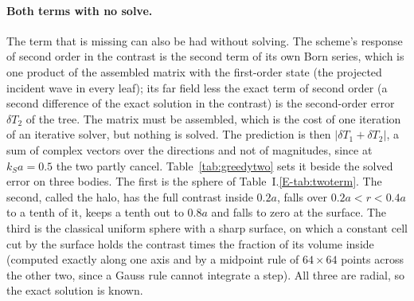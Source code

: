 \documentclass[11pt,a4paper]{article}
\begin{document}
\paragraph{Both terms with no solve.} The term that is missing can also be had without solving. The scheme's
response of second order in the contrast is the second term of its own Born series, which is one product
of the assembled matrix with the first-order state (the projected incident wave in every leaf); its
far field less the exact term of second order (a second difference of the exact solution in the contrast)
is the second-order error $\delta T_2$ of the tree. The matrix must be assembled, which is the cost of one
iteration of an iterative solver, but nothing is solved. The prediction is then $|\delta T_1+\delta T_2|$,
a sum of complex vectors over the directions and not of magnitudes, since at $k_Sa=0.5$ the two partly
cancel. Table~\ref{tab:greedytwo} sets it beside the solved error on three bodies. The first is the sphere
of Table~I.\ref{E-tab:twoterm}. The second, called the halo, has the full contrast inside $0.2a$, falls over
$0.2a<r<0.4a$ to a tenth of it, keeps a tenth out to $0.8a$ and falls to zero at the surface. The third is
the classical uniform sphere with a sharp surface, on which a constant cell cut by the surface holds the
contrast times the fraction of its volume inside (computed exactly along one axis and by a midpoint rule
of $64\times64$ points across the other two, since a Gauss rule cannot integrate a step). All three are
radial, so the exact solution is known.
\end{document}
